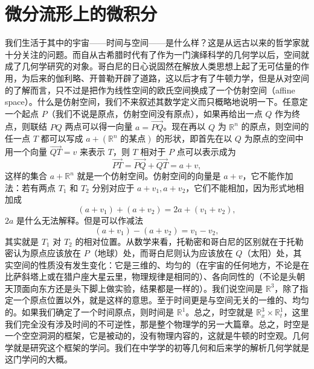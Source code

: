 \chapter{微分流形上的微积分}

我们生活于其中的宇宙——时间与空间——是什么样？这是从远古以来的哲学家就十分关注的问题。而自从古希腊时代有了作为一门演绎科学的几何学以后，空间就成了几何学研究的对象。哥白尼的日心说固然在解放人类思想上起了无可估量的作用，为后来的伽利略、开普勒开辟了道路，这以后才有了牛顿力学，但是从对空间的了解而言，只不过是把作为线性空间的欧氏空间换成了一个仿射空间（affine space）。什么是仿射空间，我们不来叙述其数学定义而只概略地说明一下。任意定一个起点 $P$（我们不说是原点，仿射空间没有原点），如果再给出一点 $Q$ 作为终点，则联结 $PQ$ 两点可以得一向量 $a=\overrightarrow{PQ}$。现在再以 $Q$ 为 $\mathbb R^n$ 的原点，则空间的任一点 $T$ 都可以写成 $a+(\mathbb R^n\text{ 的某点})$ 的形状，即首先在以 $Q$ 为原点的空间中用一个向量 $\overrightarrow{QT}=v$ 来表示 $T$，则 $T$ 相对于 $P$ 点可以表示成为
\[
\overrightarrow{PT}=\overrightarrow{PQ}+\overrightarrow{QT}=a+v,
\]
这样的集合 $a+\mathbb R^n$ 就是一个仿射空间。仿射空间的向量是 $a+v$，它不能作加法：若有两点 $T_1$ 和 $T_2$ 分别对应于 $a+v_1,a+v_2$，它们不能相加，因为形式地相加成
\[
(a+v_1)+(a+v_2)=2a+(v_1+v_2),
\]
$2a$ 是什么无法解释。但是可以作减法
\[
(a+v_1)-(a+v_2)=v_1-v_2,
\]
其实就是 $T_1$ 对 $T_2$ 的相对位置。从数学来看，托勒密和哥白尼的区别就在于托勒密认为原点应该放在 $P$（地球）处，而哥白尼则认为应该放在 $Q$（太阳）处，其实空间的性质没有发生变化：它是三维的、均匀的（在宇宙的任何地方，不论是在比萨斜塔上或在猎户座大星云里，物理规律是相同的）、各向同性的（不论是头朝天顶面向东方还是头下脚上做实验，结果都是一样的）。我们说空间是 $\mathbb R^3$，除了指定一个原点位置以外，就是这样的意思。至于时间更是与空间无关的一维的、均匀的。如果我们确定了一个时间原点，则时间是 $\mathbb R^1$。总之，时空就是 $\mathbb R_x^3\times\mathbb R_t^1$，这里我们完全没有涉及时间的不可逆性，那是整个物理学的另一大篇章。总之，时空是一个空空洞洞的框架，它是被动的，没有物理内容的，这就是牛顿的时空观。几何学就是研究这个框架的学问。我们在中学学的初等几何和后来学的解析几何学就是这门学问的大概。

